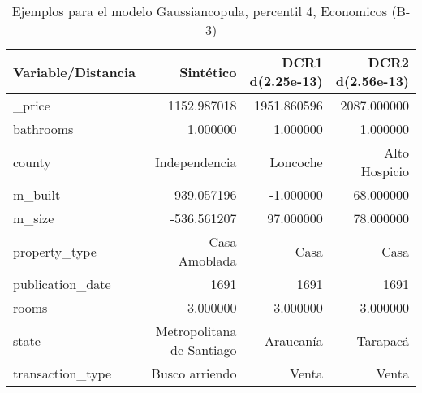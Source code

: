 \begin{table}[H]
\centering
\fontsize{10}{14}\selectfont
\caption{Ejemplos para el modelo Gaussiancopula, percentil 4, Economicos (B-3)}
\label{table-example-economicos-b-3-gaussiancopula-4p}
\begin{tabular}{|l|r|r|r|}
\hline
\rowcolor[gray]{0.8}
Variable/Distancia & Sintético & DCR1 d(2.25e-13) & DCR2 d(2.56e-13) \\
\hline \_price & \cellcolor[rgb]{0.9, 0.54, 0.52} 1152.987018 & 1951.860596 & 2087.000000 \\
\hline bathrooms & \cellcolor[rgb]{0.9, 0.54, 0.52} 1.000000 & \cellcolor[rgb]{0.9, 0.54, 0.52} 1.000000 & \cellcolor[rgb]{0.9, 0.54, 0.52} 1.000000 \\
\hline county & \cellcolor[rgb]{0.9, 0.54, 0.52} Independencia & Loncoche & Alto Hospicio \\
\hline m\_built & \cellcolor[rgb]{0.9, 0.54, 0.52} 939.057196 & -1.000000 & 68.000000 \\
\hline m\_size & \cellcolor[rgb]{0.9, 0.54, 0.52} -536.561207 & 97.000000 & 78.000000 \\
\hline property\_type & \cellcolor[rgb]{0.9, 0.54, 0.52} Casa Amoblada & Casa & Casa \\
\hline publication\_date & \cellcolor[rgb]{0.9, 0.54, 0.52} 1691 & \cellcolor[rgb]{0.9, 0.54, 0.52} 1691 & \cellcolor[rgb]{0.9, 0.54, 0.52} 1691 \\
\hline rooms & \cellcolor[rgb]{0.9, 0.54, 0.52} 3.000000 & \cellcolor[rgb]{0.9, 0.54, 0.52} 3.000000 & \cellcolor[rgb]{0.9, 0.54, 0.52} 3.000000 \\
\hline state & \cellcolor[rgb]{0.9, 0.54, 0.52} Metropolitana de Santiago & Araucanía & Tarapacá \\
\hline transaction\_type & \cellcolor[rgb]{0.9, 0.54, 0.52} Busco arriendo & Venta & Venta \\
\hline
\end{tabular}
\end{table}

